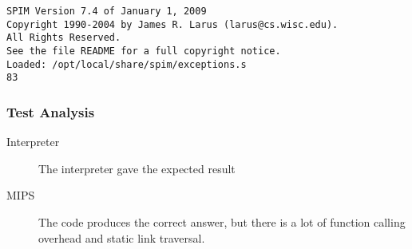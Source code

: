 \begin{verbatim}
SPIM Version 7.4 of January 1, 2009
Copyright 1990-2004 by James R. Larus (larus@cs.wisc.edu).
All Rights Reserved.
See the file README for a full copyright notice.
Loaded: /opt/local/share/spim/exceptions.s
83
\end{verbatim}
\subsubsection{Test Analysis}
\begin{description}
	\item[Interpreter] The interpreter gave the expected result
	\item[MIPS] The code produces the correct answer, but there is a lot of function calling overhead and static link traversal.
\end{description}

